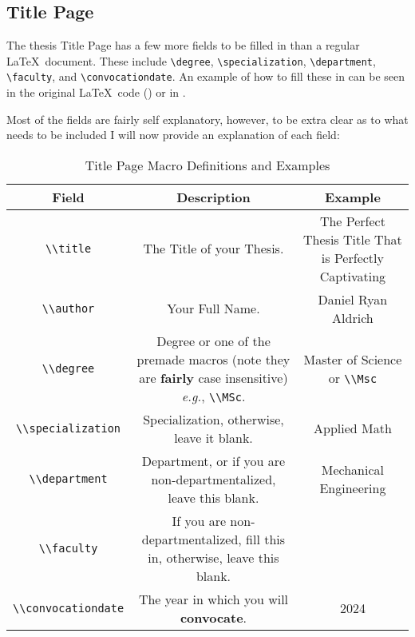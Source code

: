 		\subsection{Title Page}
			The thesis Title Page has a few more fields to be filled in than a regular \LaTeX\ document.
			These include \lstinline|\degree|, \lstinline|\specialization|, \lstinline|\department|, \lstinline|\faculty|, and \lstinline|\convocationdate|.
			An example of how to fill these in can be seen in the original \LaTeX\ code () or in .

			Most of the fields are fairly self explanatory, however, to be extra clear as to what needs to be included I will now provide an explanation of each field:

			\begin{table}[H]
			\caption{Title Page Macro Definitions and Examples}
			\label{tab:titlePage}
			\begin{tabularx}{0.9\textwidth}{cCC}
				\toprule
					\textbf{Field} & \textbf{Description} & \textbf{Example}\\
				\midrule
					\lstinline|\\title|  & The Title of your Thesis. & The Perfect Thesis Title That is Perfectly Captivating\\
					\lstinline|\\author| & Your Full Name. & Daniel Ryan Aldrich\\
					\lstinline|\\degree| & Degree or one of the premade macros (note they are \textbf{fairly} case insensitive) \textit{e.g.}, \lstinline|\\MSc|. & Master of Science or \lstinline|\\Msc|\\
					\lstinline|\\specialization| & Specialization, otherwise, leave it blank. & Applied Math\\
					\lstinline|\\department| & Department, or if you are non-departmentalized, leave this blank. & Mechanical Engineering\\
					\lstinline|\\faculty| & If you are non-departmentalized, fill this in, otherwise, leave this blank. & \\
					\lstinline|\\convocationdate| & The year in which you will \textbf{convocate}. & 2024\\
				\bottomrule
			\end{tabularx}
			\end{table}

